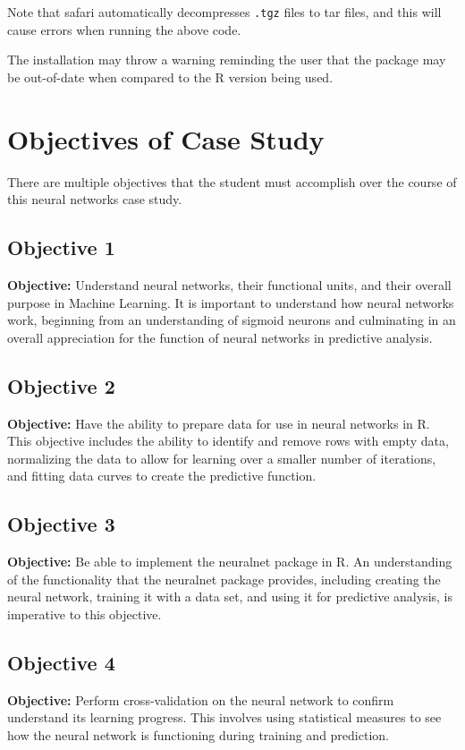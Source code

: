 \documentclass[11pt]{article}
\begin{document}
Note that safari automatically decompresses \texttt{.tgz} files to tar files, and this will cause errors when running the above code.

The installation may throw a warning reminding the user that the package may be out-of-date when compared to the R version being used. 

\section{Objectives of Case Study}

There are multiple objectives that the student must accomplish over the course of this neural networks case study.
\subsection{Objective 1}
\textbf{Objective: } Understand neural networks, their functional units, and their overall purpose in Machine Learning. It is important to understand how neural networks work, beginning from an understanding of sigmoid neurons and culminating in an overall appreciation for the function of neural networks in predictive analysis.
\subsection{Objective 2}
\textbf{Objective: } Have the ability to prepare data for use in neural networks in R. This objective includes the ability to identify and remove rows with empty data, normalizing the data to allow for learning over a smaller number of iterations, and fitting data curves to create the predictive function.
\subsection{Objective 3}
\textbf{Objective: } Be able to implement the neuralnet package in R. An understanding of the functionality that the neuralnet package provides, including creating the neural network, training it with a data set, and using it for predictive analysis, is imperative to this objective.
\subsection{Objective 4}
\textbf{Objective: } Perform cross-validation on the neural network to confirm understand its learning progress. This involves using statistical measures to see how the neural network is functioning during training and prediction.
\end{document}
